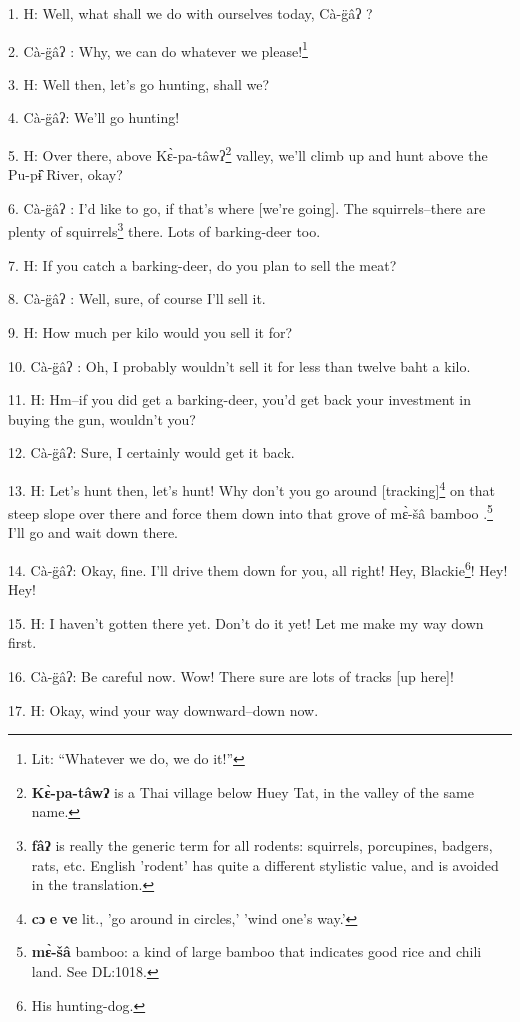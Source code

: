 \setcounter{footnote}{0}


1. H: Well, what shall we do with ourselves today, Cà-g̈âʔ ?

2. Cà-g̈âʔ : Why, we can do whatever we please!\footnote{Lit: ``Whatever we do, we do it!''}

3. H: Well then, let's go hunting, shall we?

4. Cà-g̈âʔ: We'll go hunting!

5. H: Over there, above Kɛ̀-pa-tâwʔ\footnote{\textbf{Kɛ̀-pa-tâwʔ} is a Thai village below Huey Tat, in the valley of the same name.} valley, we'll climb up and hunt above
the Pu-pɨ̂ River, okay?

6. Cà-g̈âʔ : I'd like to go, if that's where [we're going]. The squirrels--there
are plenty of squirrels\footnote{\textbf{fâʔ} is really the generic term for all rodents: squirrels, porcupines, badgers, rats, etc. English 'rodent' has quite a different stylistic value, and is avoided in the translation.} there. Lots of barking-deer too.

7. H: If you catch a barking-deer, do you plan to sell the meat?

8. Cà-g̈âʔ : Well, sure, of course I'll sell it.

9. H: How much per kilo would you sell it for?

10. Cà-g̈âʔ : Oh, I probably wouldn't sell it for less than twelve baht a kilo.

11. H: Hm--if you did get a barking-deer, you'd get back your investment in buying
the gun, wouldn't you?

12. Cà-g̈âʔ: Sure, I certainly would get it back.

13. H: Let's hunt then, let's hunt! Why don't you go around [tracking]\footnote{\textbf{cɔ} \textbf{e} \textbf{ve} lit., 'go around in circles,' 'wind one's way.'} on that
steep slope over there and force them down into that grove of mɛ̀-šâ bamboo
.\footnote{\textbf{mɛ̀-šâ} bamboo: a kind of large bamboo that indicates good rice and chili land. See DL:1018.} I'll go and wait down there.

14. Cà-g̈âʔ: Okay, fine. I'll drive them down for you, all right! Hey, Blackie\footnote{His hunting-dog.}!
Hey! Hey!

15. H: I haven't gotten there yet. Don't do it yet! Let me make my way down first.

16. Cà-g̈âʔ: Be careful now. Wow! There sure are lots of tracks [up here]!

17. H: Okay, wind your way downward--down now.

